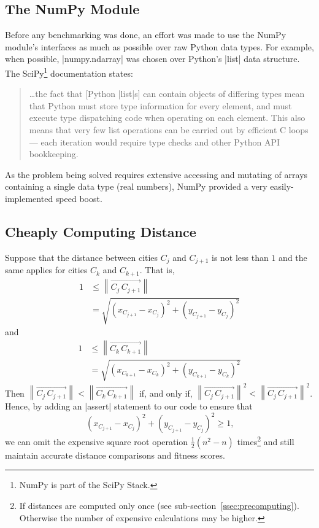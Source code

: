 \subsection{The NumPy Module}
Before any benchmarking was done, an effort was made to use the 
NumPy \cite{numpy} module's interfaces as much as possible over raw 
Python data types. For example, when possible, |numpy.ndarray| was 
chosen over Python's |list| data structure. The SciPy\footnote{NumPy is
part of the SciPy Stack.} documentation states:
\begin{quote}
	 \ldots the fact that [Python |list|s] can contain objects of differing 
	 types mean that Python must store type information for every 
	 element, and must execute type dispatching code when operating 
	 on each element. This also means that very few list operations can 
	 be carried out by efficient C loops --- each iteration would require 
	 type checks and other Python API bookkeeping. \cite{scipy_docs}
\end{quote}
As the problem being solved requires extensive accessing and mutating
of arrays containing a single data type (\ie real numbers), NumPy 
provided a very easily-implemented speed boost.

\subsection{Cheaply Computing Distance}\label{ssec:cheap}
Suppose that the distance between cities $C_j$ and $C_{j+1}$ is not less
 than $1$ and the same applies for cities $C_k$ and $C_{k+1}$. That is, 
\begin{align*}
\textstyle 1 &\leqslant \left\lVert \overrightarrow{C_j \, C_{j+1}} \right\rVert \\
&= \sqrt{(x_{C_{j+1}} - x_{C_j})^2 + (y_{C_{j+1}} - y_{C_j})^2}
\end{align*}
and
\begin{align*}
\textstyle 1 &\leqslant \left\lVert \overrightarrow{C_k\, C_{k+1}} \right\rVert \\
&= \sqrt{(x_{C_{k+1}} - x_{C_k})^2 + (y_{C_{k+1}} - y_{C_k})^2}
\end{align*}
Then 
$\left\lVert \overrightarrow{C_j\, C_{j+1}} \right\rVert < \left\lVert \overrightarrow{C_k\, C_{k+1}} \right\rVert$ 
if, and only if, 
$\left\lVert \overrightarrow{C_j\, C_{j+1}} \right\rVert^2 < \left\lVert \overrightarrow{C_j\, C_{j+1}} \right\rVert^2$.
Hence, by adding an |assert| statement to our code to ensure that 
\begin{equation*}
(x_{C_{j+1}} - x_{C_j})^2 + (y_{C_{j+1}} - y_{C_j})^2 \geqslant 1\text{,}
\end{equation*}
we can omit the expensive square root operation $\frac{1}{2}(n^2 - n)$ 
times\footnote{If distances are computed only once (see
sub-section~\ref{ssec:precomputing}). Otherwise the number of expensive
calculations may be higher.} and still maintain accurate distance 
comparisons and fitness scores. 

